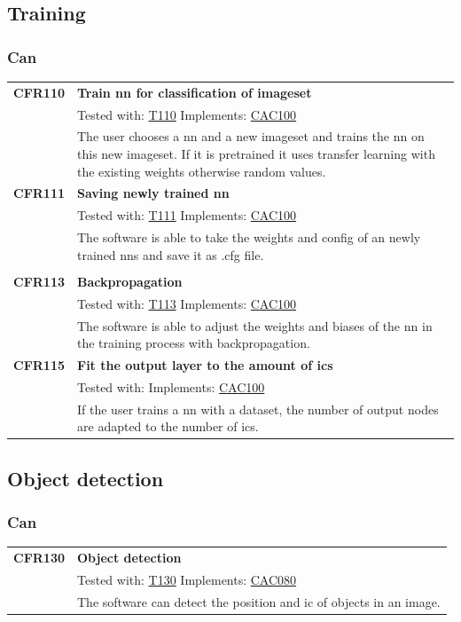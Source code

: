 \documentclass[parskip=full]{scrartcl}
\begin{document}
\subsection{Training}
\subsubsection{Can}
\begin{tabular}{p{2cm}p{11.4cm}}
\textbf{CFR110} \hypertarget{CFR110} & \textbf{Train \gls{nn} for classification of imageset}\\
& Tested with: \hyperlink{T110}{T110} Implements: \hyperlink{CAC100}{CAC100} \\
& The user chooses a \gls{nn} and a new imageset and trains the \gls{nn} on this new imageset. If it is pretrained it uses transfer learning with the existing weights otherwise random values.\\
\textbf {CFR111} \hypertarget{CFR111} & \textbf{Saving newly trained \gls{nn}} \\
& Tested with: \hyperlink{T111}{T111} Implements: \hyperlink{CAC100}{CAC100} \\
& The software is able to take the weights and config of an newly trained \glspl{nn} and save it as .cfg file. \\
& \\
\textbf {CFR113} \hypertarget{CFR113} & \textbf{Backpropagation} \\
& Tested with: \hyperlink{T113}{T113} Implements: \hyperlink{CAC100}{CAC100} \\
& The software is able to adjust the weights and biases of the \gls{nn} in the training process with backpropagation.\\
\textbf{CFR115} \hypertarget{CFR115} & \textbf{Fit the output layer to the amount of \glspl{ic}}\\
& Tested with: Implements: \hyperlink{CAC100}{CAC100} \\
& If the user trains a \gls{nn} with a dataset, the number of output nodes are adapted to the number of \glspl{ic}.\\
\end{tabular}

\subsection{Object detection}
\subsubsection{Can}
\begin{tabular}{p{2cm}p{11.4cm}}
\textbf {CFR130} \hypertarget{CFR130} & \textbf{Object detection} \\
& Tested with: \hyperlink{T130}{T130} Implements: \hyperlink{CAC080}{CAC080} \\
& The software can detect the position and \gls{ic} of objects in an image.\\

\end{tabular}
\end{document}
